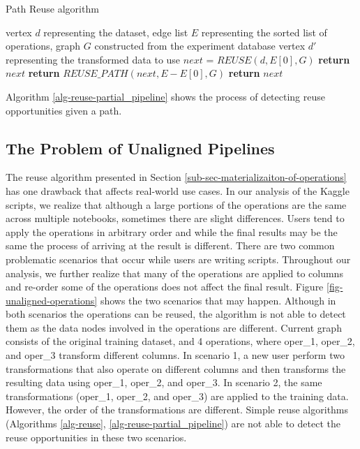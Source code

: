  
\begin{algorithm}
\caption{Path Reuse algorithm}\label{alg-reuse-partial_pipeline}
\begin{algorithmic}[1]
\Require vertex $d$ representing the dataset, edge list $E$ representing the sorted list of operations, graph $G$ constructed from the experiment database
\Ensure vertex $d'$ representing the transformed data to use
	\State $next$ = $REUSE(d, E[0],G)$
		\State \textbf{return} $next$
		\State \textbf{return} $REUSE\_PATH(next, E - E[0], G)$
	\Else
		\State \textbf{return} $next$
	\EndIf
\EndFunction
\end{algorithmic}
\end{algorithm}

Algorithm \ref{alg-reuse-partial_pipeline} shows the process of detecting reuse opportunities given a path.

\subsection{The Problem of Unaligned Pipelines}
The reuse algorithm presented in Section \ref{sub-sec-materializaiton-of-operations} has one drawback that affects real-world use cases.
In our analysis of the Kaggle scripts, we realize that although a large portions of the operations are the same across multiple notebooks, sometimes there are slight differences.
Users tend to apply the operations in arbitrary order and while the final results may be the same the process of arriving at the result is different.
There are two common problematic scenarios that occur while users are writing scripts.
Throughout our analysis, we further realize that many of the operations are applied to columns and re-order some of the operations does not affect the final result.
Figure \ref{fig-unaligned-operations} shows the two scenarios that may happen.
Although in both scenarios the operations can be reused, the algorithm is not able to detect them as the data nodes involved in the operations are different. 
Current graph consists of the original training dataset, and 4 operations, where oper\_1, oper\_2, and oper\_3 transform different columns.
In scenario 1, a new user perform two transformations that also operate on different columns and then transforms the resulting data using oper\_1, oper\_2, and oper\_3.
In scenario 2, the same transformations (oper\_1, oper\_2, and oper\_3) are applied to the training data.
However, the order of the transformations are different.
Simple reuse algorithms (Algorithms \ref{alg-reuse}, \ref{alg-reuse-partial_pipeline}) are not able to detect the reuse opportunities in these two scenarios.


